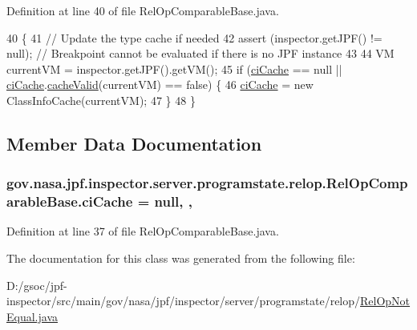 Definition at line 40 of file Rel\+Op\+Comparable\+Base.\+java.


\begin{DoxyCode}
40                                                                \{
41     \textcolor{comment}{// Update the type cache if needed}
42     assert (inspector.getJPF() != null); \textcolor{comment}{// Breakpoint cannot be evaluated if there is no JPF instance}
43 
44     VM currentVM = inspector.getJPF().getVM();
45     \textcolor{keywordflow}{if} (\hyperlink{classgov_1_1nasa_1_1jpf_1_1inspector_1_1server_1_1programstate_1_1relop_1_1_rel_op_comparable_base_a3bd22b88a44dff54d68b1d8a3e8f3d0a}{ciCache} == null || \hyperlink{classgov_1_1nasa_1_1jpf_1_1inspector_1_1server_1_1programstate_1_1relop_1_1_rel_op_comparable_base_a3bd22b88a44dff54d68b1d8a3e8f3d0a}{ciCache}.\hyperlink{classgov_1_1nasa_1_1jpf_1_1inspector_1_1utils_1_1_class_info_cache_ac71fb1624b72457166c1326d44fb50c5}{cacheValid}(currentVM) == \textcolor{keyword}{false}) \{
46       \hyperlink{classgov_1_1nasa_1_1jpf_1_1inspector_1_1server_1_1programstate_1_1relop_1_1_rel_op_comparable_base_a3bd22b88a44dff54d68b1d8a3e8f3d0a}{ciCache} = \textcolor{keyword}{new} ClassInfoCache(currentVM);
47     \}
48   \}
\end{DoxyCode}


\subsection{Member Data Documentation}
\subsubsection[{\texorpdfstring{ci\+Cache}{ciCache}}]{ gov.\+nasa.\+jpf.\+inspector.\+server.\+programstate.\+relop.\+Rel\+Op\+Comparable\+Base.\+ci\+Cache = null\hspace{0.3cm}{\ttfamily [static]}, {\ttfamily [protected]}, {\ttfamily [inherited]}}\hypertarget{classgov_1_1nasa_1_1jpf_1_1inspector_1_1server_1_1programstate_1_1relop_1_1_rel_op_comparable_base_a3bd22b88a44dff54d68b1d8a3e8f3d0a}{}\label{classgov_1_1nasa_1_1jpf_1_1inspector_1_1server_1_1programstate_1_1relop_1_1_rel_op_comparable_base_a3bd22b88a44dff54d68b1d8a3e8f3d0a}


Definition at line 37 of file Rel\+Op\+Comparable\+Base.\+java.



The documentation for this class was generated from the following file\+:\begin{DoxyCompactItemize}
\item 
D\+:/gsoc/jpf-\/inspector/src/main/gov/nasa/jpf/inspector/server/programstate/relop/\hyperlink{_rel_op_not_equal_8java}{Rel\+Op\+Not\+Equal.\+java}\end{DoxyCompactItemize}
